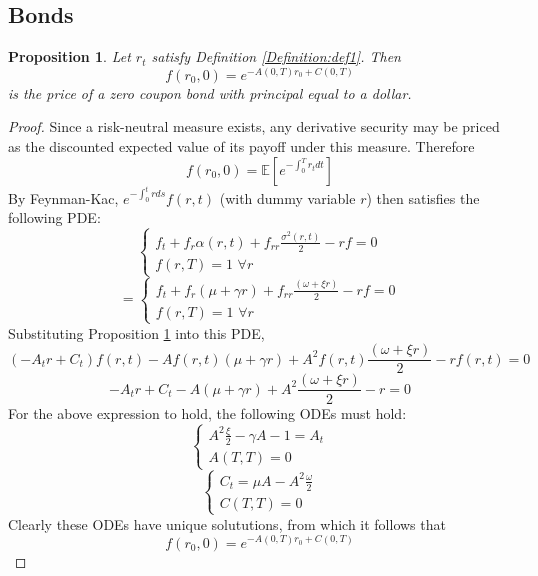\documentclass[12pt]{article}
\newtheorem{bond}{Proposition}
\theoremstyle{definition}
\theoremstyle{remark}
\begin{document}
\subsection{Bonds}
\begin{bond}
Let \(r_t\) satisfy Definition \ref{Definition:def1}.  Then
\[f(r_0, 0)=e^{-A(0, T)r_0+C(0, T)}\] is the price of a zero coupon bond with principal equal to a dollar.
\label{Proposition:prop1}
\end{bond}
\begin{proof}
Since a risk-neutral measure exists, any derivative security may be priced as the discounted expected value of its payoff under this measure.  Therefore \[f(r_0, 0)=\mathbb{E}\left[e^{-\int_0 ^T r_t dt}\right]\]  
By Feynman-Kac, \(e^{-\int _0 ^ t r ds} f(r, t)\) (with dummy variable \(r\)) then satisfies the following PDE:
\begin{equation*}
\left\{
\begin{array}{rl}
f_t+f_{r} \alpha(r, t)+f_{rr} \frac{\sigma^2 (r, t)}{2} -rf=0 \\
f(r, T)=1\,\,\forall r
\end{array}
\right.
\end{equation*}
\begin{equation}
=\left\{
\begin{array}{rl}
f_t+f_{r} (\mu+\gamma r)+f_{rr} \frac{(\omega+\xi r)}{2} -rf=0 \\
f(r, T)=1\,\,\forall r
\end{array}
\right.
\label{Equation:eq3}
\end{equation}
Substituting Proposition \ref{Proposition:prop1} into this PDE, 
\[(-A_t r+C_t)f(r, t)-A f(r, t)(\mu+\gamma r)+A^2 f(r, t)\frac{(\omega+\xi r)}{2}-rf(r, t) =0\]
\[-A_t r+C_t-A (\mu+\gamma r)+A^2 \frac{(\omega+\xi r)}{2}-r=0\]
For the above expression to hold, the following ODEs must hold:
\begin{equation}
\left\{
\begin{array}{rl}
A^2 \frac{\xi}{2}-\gamma A-1 =A_t \\
A(T, T)=0
\label{Equation:eqode}
\end{array}
\right.
\end{equation}
\begin{equation}
\left\{
\begin{array}{rl}
C_t =\mu A -A^2 \frac{\omega}{2} \\
C(T, T)=0
\end{array}
\right.
\label{Equation:eq10}
\end{equation}
Clearly these ODEs have unique solututions, from which it follows that 
\[f(r_0, 0)=e^{-A(0, T)r_0+C(0, T)}\]
\end{proof}
\end{document}
